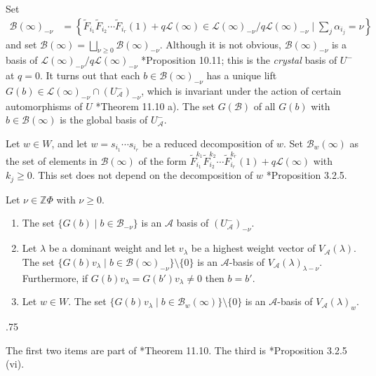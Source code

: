 \documentclass[11pt,fleqn]{article}
\makeatletter
\renewenvironment{proof}[1][\textit{Proof}]{\par
  \pushQED{\qed}%
  \normalfont \topsep.75\paraskip\relax
  \trivlist
  \item[\hskip\labelsep
        \itshape
    #1\@addpunct{.}]\ignorespaces
}{%
  \popQED\endtrivlist\@endpefalse
}
\newcommand\ZZ{\mathbb Z}
\newcommand\A{\mathcal A}
\newcommand\B{\mathcal B}
\renewcommand\L{\mathcal L}
\makeatother
\begin{document}
Set
\begin{align*}
\B(\infty)_{-\nu} 
  &=  \left\{\tilde F_{i_1} \tilde F_{i_2} \cdots 
    \tilde F_{i_r}(1) + q\L(\infty) \in \L(\infty)_{-\nu} / q \L(\infty)_{-\nu}
     \mid \sum_{j} \alpha_{i_j} = \nu\right\}
\end{align*}
and set $\B(\infty) = \bigsqcup_{\nu \geq 0} \B(\infty)_{-\nu}$. Although it is
not obvious, $\B(\infty)_{-\nu}$ is a basis of $\L(\infty)_{-\nu} / 
q \L(\infty)_{-\nu}$ \cite{Jan}*{Proposition 10.11}; this is the \emph{crystal}
basis of $U^-$ at $q = 0$. It turns out that each 
$b \in \B(\infty)_{-\nu}$ has a unique lift $G(b) \in \L(\infty)_{-\nu} \cap 
(U_\A^-)_{-\nu}$, which is invariant under the action of certain automorphisms 
of $U$ \cite{Jan}*{Theorem 11.10 a)}. The set $G(\B)$ of all $G(b)$ with $b 
\in \B(\infty)$ is the global basis of $U_\A^-$.

Let $w \in W$, and let $w = s_{i_1}\cdots s_{i_r}$ be a reduced decomposition 
of $w$. Set $\B_w(\infty)$ as the set of elements in $\B(\infty)$ of the form 
$\tilde F_{i_1}^{k_1} \tilde F_{i_2}^{k_2} \cdots \tilde 
F_{i_r}^{k_r}(1) + q\L(\infty)$ with $k_j \geq 0$. This set does not depend on 
the decomposition of $w$ \cite{K1}*{Proposition 3.2.5}.

\begin{Theorem*}
Let $\nu \in \ZZ \Phi$ with $\nu \geq 0$.
\begin{enumerate}[label=(\alph*)]
\item The set $\{G(b) \mid b \in \B_{-\nu}\}$ is an $\A$ basis of 
$(U_\A^-)_{- \nu}$.

\item Let $\lambda$ be a dominant weight and let $v_\lambda$ be a highest 
weight vector of $V_\A(\lambda)$. The set $\{G(b)v_\lambda \mid b \in 
\B(\infty)_{-\nu}\} \setminus \{0\}$ is an $\A$-basis of 
$V_\A(\lambda)_{\lambda - \nu}$. Furthermore, if $G(b)v_\lambda = 
G(b')v_\lambda \neq 0$ then $b = b'$.

\item Let $w \in W$. The set $\{G(b)v_\lambda \mid b \in \B_w(\infty)\} 
\setminus \{0\}$ is an $\A$-basis of $V_\A(\lambda)_{w}$. 
\end{enumerate}
\end{Theorem*}
\begin{proof}
The first two items are part of \cite{Jan}*{Theorem 11.10}. The third is 
\cite{K1}*{Proposition 3.2.5 (vi)}.
\end{proof}
\end{document}
